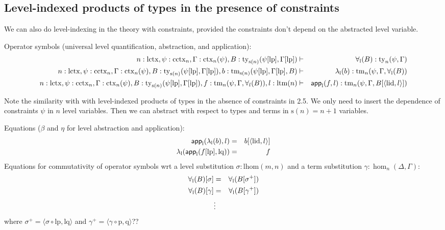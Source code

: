 \documentclass[11pt,a4paper]{article}
\theoremstyle{definition}
\newcommand{\app}[2]{{#1\,#2}} %
\def\lhom{\mathrm{lhom}}
\def\lctx{\mathrm{lctx}}
\def\ltm{\mathrm{ltm}}
\def\lp{\mathrm{lp}}
\def\lq{\mathrm{lq}}
\def\s{\mathrm{s}}
\def\lid{\mathrm{lid}}
\def\cctx{\mathrm{cctx}}
\newcommand{\ctx}{\mathrm{ctx}}
\newcommand{\ty}{\mathrm{ty}}
\newcommand{\tm}{\mathrm{tm}}
\newcommand{\tuple}[1]{\langle #1 \rangle}
\def\p{\mathrm{p}}
\def\q{\mathrm{q}}
\def\app{\mathsf{app}}
\begin{document}
\subsection{Level-indexed products of types in the presence of constraints}

We can also do level-indexing in the theory with constraints, provided the constraints don't depend on the abstracted level variable.

\begin{tiny}
Operator symbols (universal level quantification, abstraction, and application):
\begin{eqnarray*}
n : \lctx, \psi : \cctx_{n}, \Gamma : \ctx_n(\psi), B : \ty_{\s(n)}(\psi[\lp],\Gamma[\lp])&\vdash& \forall_\l(B) : \ty_n(\psi,\Gamma)\\
n : \lctx, \psi : \cctx_{n}, \Gamma : \ctx_n(\psi), B : \ty_{\s(n)}(\psi[\lp],\Gamma[\lp]), b : \tm_{\s(n)}(\psi[\lp],\Gamma[\lp], B) &\vdash&  \lambda_\l(b) : \tm_n(\psi,\Gamma,\forall_\l(B))\\
n : \lctx, \psi : \cctx_{n}, \Gamma : \ctx_n(\psi), B : \ty_{\s(n)}(\psi[\lp],\Gamma[\lp]), f :  \tm_n(\psi,\Gamma,\forall_l(B)),  l : \ltm(n) &\vdash& \app_\l(f,l) : \tm_n(\psi,\Gamma, B[\tuple{\lid,l}])
\end{eqnarray*}
\end{tiny}

Note the similarity with with level-indexed products of types in the absence of constraints in 2.5. We only need to insert the dependence of constraints $\psi$ in $n$ level variables. Then we can abstract with respect to types and terms in $\s(n) = n+1$ variables.
\begin{tiny}
Equations ($\beta$ and $\eta$ for level abstraction and application):
 \begin{eqnarray*}
 \app_\l(\lambda_\l(b),l) &=& b[\tuple{\lid,l}]\\
 \lambda_\l(\app_\l(f[\lp],\lq)) &=& f
 \end{eqnarray*}
 Equations for commutativity of operator symbols wrt a level substitution $\sigma : \lhom(m,n)$ and a term substitution $\gamma : \hom_n(\Delta,\Gamma)$:
 \begin{eqnarray*}
 \forall_{\mathrm{l}}(B)[ \sigma ] &=& \forall_{\mathrm{l}}(B[ \sigma^{+}])\\
 \forall_{\mathrm{l}}(B)[ \gamma ] &=& \forall_{\mathrm{l}}(B[ \gamma^+ ])\\
&\vdots&
\end{eqnarray*}
where $\sigma^+ = \tuple{\sigma \circ \lp, \lq}$ and $\gamma^+ = \tuple{\gamma \circ \p, \q}$??
\end{tiny}
\end{document}
